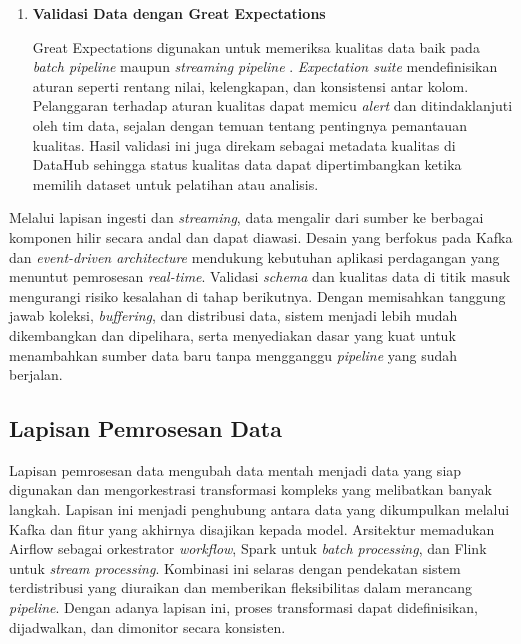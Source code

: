 \begin{enumerate}
    \vspace{0.5em}

    \item \textbf{Validasi Data dengan Great Expectations}  

    Great Expectations digunakan untuk memeriksa kualitas data baik pada \textit{batch pipeline} maupun \textit{streaming pipeline} \autocite{greatexpectations2024}. \textit{Expectation suite} mendefinisikan aturan seperti rentang nilai, kelengkapan, dan konsistensi antar kolom. Pelanggaran terhadap aturan kualitas dapat memicu \textit{alert} dan ditindaklanjuti oleh tim data, sejalan dengan temuan \textcite{chien2022improve} tentang pentingnya pemantauan kualitas. Hasil validasi ini juga direkam sebagai metadata kualitas di DataHub sehingga status kualitas data dapat dipertimbangkan ketika memilih dataset untuk pelatihan atau analisis.

    \vspace{0.5em}
\end{enumerate}

Melalui lapisan ingesti dan \textit{streaming}, data mengalir dari sumber ke berbagai komponen hilir secara andal dan dapat diawasi. Desain yang berfokus pada Kafka dan \textit{event-driven architecture} mendukung kebutuhan aplikasi perdagangan yang menuntut pemrosesan \textit{real-time}. Validasi \textit{schema} dan kualitas data di titik masuk mengurangi risiko kesalahan di tahap berikutnya. Dengan memisahkan tanggung jawab koleksi, \textit{buffering}, dan distribusi data, sistem menjadi lebih mudah dikembangkan dan dipelihara, serta menyediakan dasar yang kuat untuk menambahkan sumber data baru tanpa mengganggu \textit{pipeline} yang sudah berjalan.

\subsection{Lapisan Pemrosesan Data}

Lapisan pemrosesan data mengubah data mentah menjadi data yang siap digunakan dan mengorkestrasi transformasi kompleks yang melibatkan banyak langkah. Lapisan ini menjadi penghubung antara data yang dikumpulkan melalui Kafka dan fitur yang akhirnya disajikan kepada model. Arsitektur memadukan Airflow sebagai orkestrator \textit{workflow}, Spark untuk \textit{batch processing}, dan Flink untuk \textit{stream processing}. Kombinasi ini selaras dengan pendekatan sistem terdistribusi yang diuraikan \textcite{rodrigues2025architecture} dan memberikan fleksibilitas dalam merancang \textit{pipeline}. Dengan adanya lapisan ini, proses transformasi dapat didefinisikan, dijadwalkan, dan dimonitor secara konsisten.

